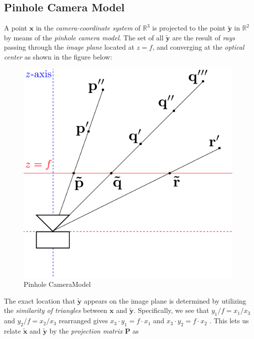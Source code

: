 \subsection{Pinhole Camera Model}

\par A point $\mathbf{x}$ in the \textit{camera-coordinate system} of $\mathbb{R}^3$ is projected to the point $\mathbf{\tilde{y}}$ in $\mathbb{R}^{2}$ by means of the \textit{pinhole camera model}. The set of all $\mathbf{\tilde{y}}$ are the result of \textit{rays} passing through the \textit{image plane} located at $z=f$, and converging at the \textit{optical center} as shown in the figure below:
\begin{figure}[htbp]
	\centering
%	
	\includegraphics[scale=0.25]{Camera}
	\caption{Pinhole CameraModel}
\end{figure}\newline
\par The exact location that $\mathbf{\tilde{y}}$ appears on the image plane is determined by utilizing the \textit{similarity of triangles} between $\mathbf{x}$ and $\mathbf{\tilde{y}}$. 
Specifically, we see that $y_1/f=x_1/x_3$ and $y_2/f=x_2/x_3$ rearranged gives $x_3\cdot y_1=f\cdot x_1$ and $x_3\cdot y_2=f\cdot x_2$ . This lets us relate $\mathbf{\tilde{x}}$ and $\mathbf{\tilde{y}}$ by the \textit{projection matrix} $\mathbf{P}$ as
